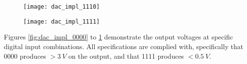 \begin{figure}[!htb]
    \centering
    \begin{minipage}{.4\textwidth}
        \centering
        \texttt{[image: dac\_impl\_1110]}
        \label{fig:dac_impl_1110}
    \end{minipage}
    \begin{minipage}{.35\textwidth}
        \centering
        \texttt{[image: dac\_impl\_1111]}
        \label{fig:dac_impl_1111}
    \end{minipage}
\end{figure}

Figures \ref{fig:dac_impl_0000} to \ref{fig:dac_impl_1111} demonstrate the output voltages at specific digital input combinations.
All specifications are complied with, specifically that 0000 produces $> \SI{3}{V}$ on the output, and that 1111 produces $< \SI{0.5}{V}$.